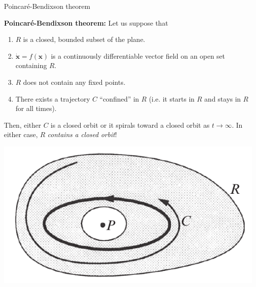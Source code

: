 \documentclass[usenames,dvipsnames,svgnames,10pt,aspectratio=169]{beamer}
\begin{document}
\begin{frame}[t, c]{Poincaré-Bendixson theorem}{}
  \begin{minipage}{.68\textwidth}
    \textbf{Poincaré-Bendixson theorem:} Let us suppose that
    \begin{enumerate}
    \item $R$ is a closed, bounded subset of the plane.
    \item $\dot{\bm{x}} = f(\bm{x})$ is a continuously differentiable vector field on an open set containing $R$.
    \item $R$ does not contain any fixed points.
    \item There exists a trajectory $C$ ``confined'' in $R$ (i.e. it starts in $R$ and stays in $R$ for all times).
    \end{enumerate}
    Then, either $C$ is a closed orbit or it spirals toward a closed orbit as $t \to \infty$.
    In either case, $R$ \emph{contains a closed orbit}!
  \end{minipage}%
  \hfill
  \begin{minipage}{.28\textwidth}
    \centering
    \includegraphics[width=\textwidth]{pb_theorem}
  \end{minipage}
\end{frame}
\end{document}
